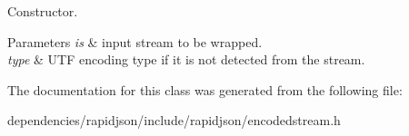 Constructor. 


\begin{DoxyParams}{Parameters}
{\em is} & input stream to be wrapped. \\
\hline
{\em type} & U\+TF encoding type if it is not detected from the stream. \\
\hline
\end{DoxyParams}


The documentation for this class was generated from the following file\+:\begin{DoxyCompactItemize}
\item 
dependencies/rapidjson/include/rapidjson/encodedstream.\+h\end{DoxyCompactItemize}
